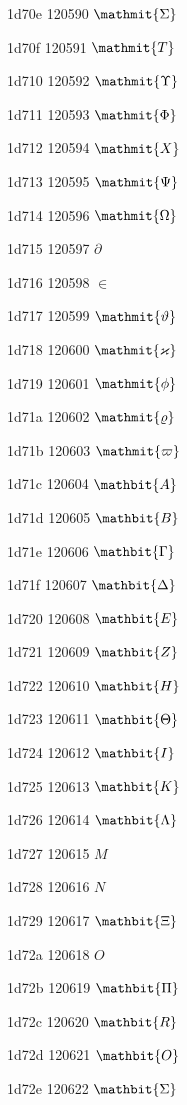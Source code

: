 \documentclass[11pt]{article}
\begin{document}
1d70e 120590 \ensuremath{\mathmit{\Sigma}}

1d70f 120591 \ensuremath{\mathmit{T}}

1d710 120592 \ensuremath{\mathmit{\Upsilon}}

1d711 120593 \ensuremath{\mathmit{\Phi}}

1d712 120594 \ensuremath{\mathmit{X}}

1d713 120595 \ensuremath{\mathmit{\Psi}}

1d714 120596 \ensuremath{\mathmit{\Omega}}

1d715 120597 \ensuremath{\partial}

1d716 120598 \ensuremath{\in}

1d717 120599 \ensuremath{\mathmit{\vartheta}}

1d718 120600 \ensuremath{\mathmit{\varkappa}}

1d719 120601 \ensuremath{\mathmit{\phi}}

1d71a 120602 \ensuremath{\mathmit{\varrho}}

1d71b 120603 \ensuremath{\mathmit{\varpi}}

1d71c 120604 \ensuremath{\mathbit{A}}

1d71d 120605 \ensuremath{\mathbit{B}}

1d71e 120606 \ensuremath{\mathbit{\Gamma}}

1d71f 120607 \ensuremath{\mathbit{\Delta}}

1d720 120608 \ensuremath{\mathbit{E}}

1d721 120609 \ensuremath{\mathbit{Z}}

1d722 120610 \ensuremath{\mathbit{H}}

1d723 120611 \ensuremath{\mathbit{\Theta}}

1d724 120612 \ensuremath{\mathbit{I}}

1d725 120613 \ensuremath{\mathbit{K}}

1d726 120614 \ensuremath{\mathbit{\Lambda}}

1d727 120615 \ensuremath{M}

1d728 120616 \ensuremath{N}

1d729 120617 \ensuremath{\mathbit{\Xi}}

1d72a 120618 \ensuremath{O}

1d72b 120619 \ensuremath{\mathbit{\Pi}}

1d72c 120620 \ensuremath{\mathbit{R}}

1d72d 120621 \ensuremath{\mathbit{O}}

1d72e 120622 \ensuremath{\mathbit{\Sigma}}
\end{document}
